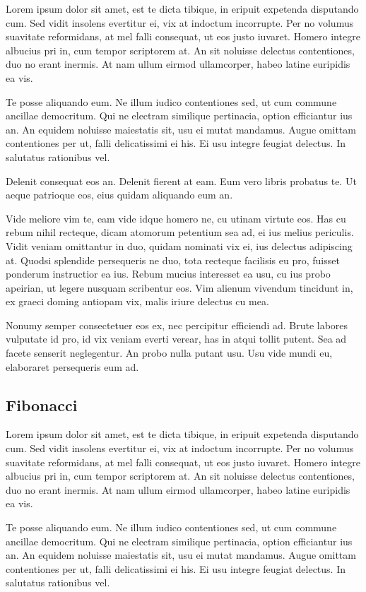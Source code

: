 \documentclass[10pt, letterpapper]{proc}
\begin{document}
Lorem ipsum dolor sit amet, est te dicta tibique, in eripuit expetenda disputando cum. Sed vidit insolens evertitur ei, vix at indoctum incorrupte. Per no volumus suavitate reformidans, at mel falli consequat, ut eos justo iuvaret. Homero integre albucius pri in, cum tempor scriptorem at. An sit noluisse delectus contentiones, duo no erant inermis. At nam ullum eirmod ullamcorper, habeo latine euripidis ea vis.

Te posse aliquando eum. Ne illum iudico contentiones sed, ut cum commune ancillae democritum. Qui ne electram similique pertinacia, option efficiantur ius an. An equidem noluisse maiestatis sit, usu ei mutat mandamus. Augue omittam contentiones per ut, falli delicatissimi ei his. Ei usu integre feugiat delectus. In salutatus rationibus vel.

Delenit consequat eos an. Delenit fierent at eam. Eum vero libris probatus te. Ut aeque patrioque eos, eius quidam aliquando eum an.

Vide meliore vim te, eam vide idque homero ne, cu utinam virtute eos. Has cu rebum nihil recteque, dicam atomorum petentium sea ad, ei ius melius periculis. Vidit veniam omittantur in duo, quidam nominati vix ei, ius delectus adipiscing at. Quodsi splendide persequeris ne duo, tota recteque facilisis eu pro, fuisset ponderum instructior ea ius. Rebum mucius interesset ea usu, cu ius probo apeirian, ut legere nusquam scribentur eos. Vim alienum vivendum tincidunt in, ex graeci doming antiopam vix, malis iriure delectus cu mea.

Nonumy semper consectetuer eos ex, nec percipitur efficiendi ad. Brute labores vulputate id pro, id vix veniam everti verear, has in atqui tollit putent. Sea ad facete senserit neglegentur. An probo nulla putant usu. Usu vide mundi eu, elaboraret persequeris eum ad.

\subsection{Fibonacci}
Lorem ipsum dolor sit amet, est te dicta tibique, in eripuit expetenda disputando cum. Sed vidit insolens evertitur ei, vix at indoctum incorrupte. Per no volumus suavitate reformidans, at mel falli consequat, ut eos justo iuvaret. Homero integre albucius pri in, cum tempor scriptorem at. An sit noluisse delectus contentiones, duo no erant inermis. At nam ullum eirmod ullamcorper, habeo latine euripidis ea vis.

Te posse aliquando eum. Ne illum iudico contentiones sed, ut cum commune ancillae democritum. Qui ne electram similique pertinacia, option efficiantur ius an. An equidem noluisse maiestatis sit, usu ei mutat mandamus. Augue omittam contentiones per ut, falli delicatissimi ei his. Ei usu integre feugiat delectus. In salutatus rationibus vel.
\end{document}
